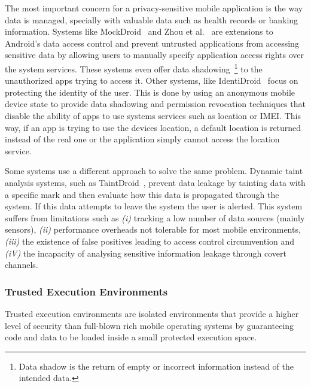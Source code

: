 The most important concern for a privacy-sensitive mobile application is the way data is managed, specially with valuable data such as health records or banking information. Systems like MockDroid~\cite{beresford2011mockdroid} and Zhou et al.~\cite{zhou2011taming} are extensions to Android's data access control and prevent untrusted applications from accessing sensitive data by allowing users to manually specify application access rights over the system services. These systems even offer data shadowing~\footnote{Data shadow is the return of empty or incorrect information instead of the intended data.} to the unauthorized apps trying to access it. Other systems, like IdentiDroid~\cite{shebaro2014identidroid} focus on protecting the identity of the user. This is done by using an anonymous mobile device state to provide data shadowing and permission revocation techniques that disable the ability of apps to use systems services such as location or \ac{IMEI}. This way, if an app is trying to use the devices location, a default location is returned instead of the real one or the application simply cannot access the location service.

Some systems use a different approach to solve the same problem. Dynamic taint analysis systems, such as TaintDroid~\cite{enck2014taintdroid}, prevent data leakage by tainting data with a specific mark and then evaluate how this data is propagated through the system. If this data attempts to leave the system the user is alerted. This system suffers from limitations such as \emph{(i)} tracking a low number of data sources (mainly sensors), \emph{(ii)} performance overheads not tolerable for most mobile environments, \emph{(iii)} the existence of false positives leading to access control circumvention and \emph{(iV)} the incapacity of analysing sensitive information leakage through covert channels.

\subsubsection{Trusted Execution Environments}
\label{sec:tee}

Trusted execution environments are isolated environments that provide a higher level of security than full-blown rich mobile operating systems by guaranteeing code and data to be loaded inside a small protected execution space.

